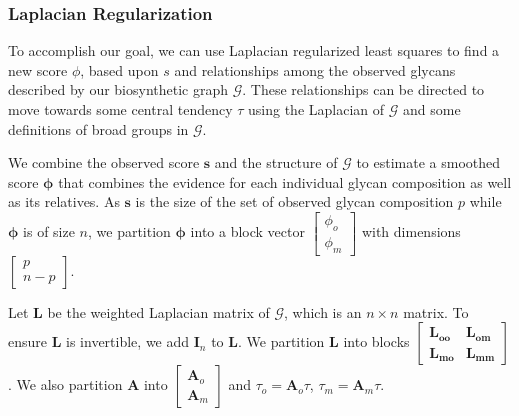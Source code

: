     \subsubsection{Laplacian Regularization}
        To accomplish our goal, we can use Laplacian regularized
        least squares to find a new score $\phi$, based upon $s$
        and relationships among the observed glycans described by
        our biosynthetic graph $\mathcal{G}$. These relationships
        can be directed to move towards some central tendency $\tau$
        using the Laplacian of $\mathcal{G}$ and some definitions of
        broad groups in $\mathcal{G}$.

        We combine the observed score $\mathbf{s}$ and the structure
        of $\mathcal{G}$ to estimate a smoothed score $\mathbf{\phi}$
        that combines the evidence for each individual glycan composition
        as well as its relatives. As $\mathbf{s}$ is the size of the
        set of observed glycan composition $p$ while $\mathbf{\phi}$
        is of size $n$, we partition $\mathbf{\phi}$ into a block
        vector $\begin{bmatrix}\phi_o\\ \phi_m\end{bmatrix}$ with
        dimensions $\begin{bmatrix}p\\ n-p\end{bmatrix}$.

        Let $\mathbf{L}$ be the weighted Laplacian matrix of $\mathcal{G}$,
        which is an $n \times n$ matrix. To ensure $\mathbf{L}$ is
        invertible, we add $\mathbf{I}_n$ to $\mathbf{L}$. We partition
        $\mathbf{L}$ into blocks $\begin{bmatrix} \mathbf{L_{oo}} &
        \mathbf{L_{om}} \\ \mathbf{L_{mo}} & \mathbf{L_{mm}}\end{bmatrix}$.
        We also partition $\mathbf{A}$ into $\begin{bmatrix}\mathbf{A}_o\\
        \mathbf{A}_m\end{bmatrix}$ and $\tau_o = \mathbf{A}_o\tau$,
        $\tau_m = \mathbf{A}_m\tau$.

